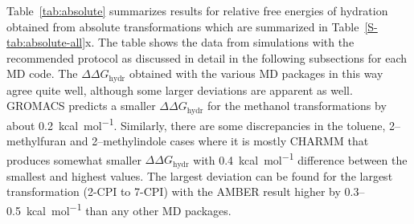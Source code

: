 \documentclass[journal=jctcce,manuscript=article]{achemso}
\begin{document}
Table~\ref{tab:absolute} summarizes results for relative free energies of 
hydration obtained from absolute transformations which are summarized in Table~\ref{S-tab:absolute-all}x.  The table shows the data 
from simulations with the recommended protocol as discussed in detail in the 
following subsections for each MD code. The $\Delta\Delta G_{\mathrm{hydr}}$ 
obtained with the various MD packages in 
this way agree quite well, although some larger deviations are apparent as 
well.  GROMACS predicts a smaller $\Delta\Delta G_{\mathrm{hydr}}$ for the 
methanol transformations by about \SI{0.2}{kcal.mol^{-1}}.  Similarly, there 
are some discrepancies in the toluene, 2--methylfuran and 2--methylindole cases 
where it is mostly CHARMM that produces somewhat smaller $\Delta\Delta 
G_{\mathrm{hydr}}$ with \SI{0.4}{kcal.mol^{-1}} difference between the 
smallest and highest values.  The largest deviation can be found for the largest 
transformation (2-CPI to 7-CPI) with the AMBER result higher by 0.3--\SI{0.5}{kcal.mol^{-1}} than any other MD packages.
\begin{table}[]
  \begin{minipage}{\linewidth}
    \caption{Comparing relative free energies of hydration for various MD 
    packages as obtained from the absolute protocol.}\label{tab:absolute}
  \end{minipage}
\end{table}
\end{document}
